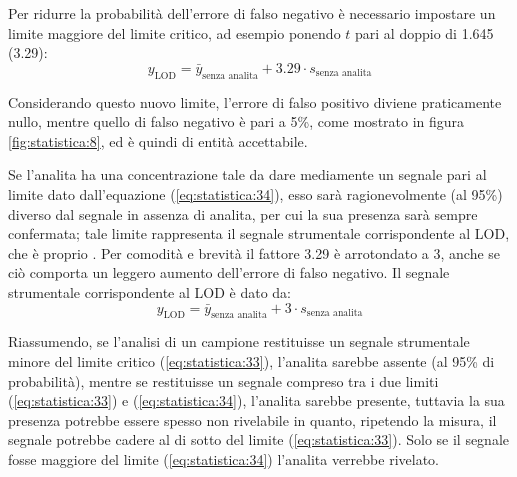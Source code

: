 Per ridurre la probabilità dell'errore di falso negativo è necessario impostare un limite maggiore del limite critico, ad esempio ponendo $t$ pari al doppio di 1.645 (3.29):
\begin{equation} \label{eq:statistica:34}
y_{\mathrm{LOD}} = \bar{y}_{\text{senza analita}} + 3.29 \cdot s_{\text{senza analita}}
\end{equation}

Considerando questo nuovo limite, l'errore di falso positivo diviene praticamente nullo, mentre quello di falso negativo è pari a 5\%, come mostrato in figura \ref{fig:statistica:8}, ed è quindi di entità accettabile.

Se l'analita ha una concentrazione tale da dare mediamente un segnale pari al limite dato dall'equazione (\ref{eq:statistica:34}), esso sarà ragionevolmente  (al 95\%) diverso dal segnale in assenza di analita, per cui la sua presenza sarà sempre confermata; tale limite rappresenta il segnale strumentale corrispondente al LOD, che è proprio . Per comodità e brevità il fattore 3.29 è arrotondato a 3, anche se ciò comporta un leggero aumento dell'errore di falso negativo. Il segnale strumentale corrispondente al LOD è dato da:
\begin{equation} \label{eq:statistica:35}
y_{\mathrm{LOD}} = \bar{y}_{\text{senza analita}} + 3 \cdot s_{\text{senza analita}}
\end{equation}


Riassumendo, se l'analisi di un campione restituisse un segnale strumentale minore del limite critico (\ref{eq:statistica:33}), l'analita sarebbe  assente (al 95\% di probabilità), mentre se restituisse un segnale compreso tra i due limiti (\ref{eq:statistica:33}) e (\ref{eq:statistica:34}), l'analita sarebbe  presente, tuttavia la sua presenza potrebbe essere spesso non rivelabile in quanto, ripetendo la misura, il segnale potrebbe cadere al di sotto del limite (\ref{eq:statistica:33}). Solo se il segnale fosse maggiore del limite (\ref{eq:statistica:34}) l'analita verrebbe  rivelato.

